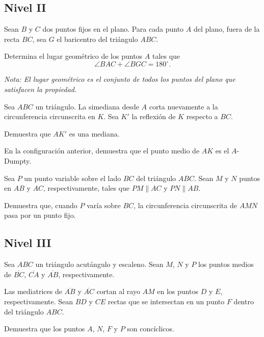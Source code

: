 \documentclass[11pt]{scrartcl}
\begin{document}
\subsection{Nivel II}

\begin{problem} %
Sean $B$ y $C$ dos puntos fijos en el plano. Para cada punto $A$ del plano, fuera de la recta $BC$, sea $G$ el baricentro del triángulo $ABC$. 

Determina el lugar geométrico de los puntos $A$ tales que
\[
\angle BAC + \angle BGC = 180^\circ.
\]

\textit{Nota: El lugar geométrico es el conjunto de todos los puntos del plano que satisfacen la propiedad.}
\end{problem}

\begin{problem}
    Sea $ABC$ un triángulo. La simediana desde $A$ corta nuevamente a la circunferencia circunscrita en $K$. Sea $K'$ la reflexión de $K$ respecto a $BC$. 

Demuestra que $AK'$ es una mediana.
\end{problem}

\begin{problem}
    En la configuración anterior, demuestra que el punto medio de $AK$ es el $A$-Dumpty.
\end{problem}

\begin{problem}
    Sea $P$ un punto variable sobre el lado $BC$ del triángulo $ABC$. Sean $M$ y $N$ puntos en $AB$ y $AC$, respectivamente, tales que $PM \parallel AC$ y $PN \parallel AB$.

Demuestra que, cuando $P$ varía sobre $BC$, la circunferencia circunscrita de $AMN$ pasa por un punto fijo.
\end{problem}
\subsection{Nivel III}

\begin{problem} %
     Sea $ABC$ un triángulo acutángulo y escaleno. Sean $M$, $N$ y $P$ los puntos medios de $\overline{BC}$, $\overline{CA}$ y $\overline{AB}$, respectivamente.  

Las mediatrices de $\overline{AB}$ y $\overline{AC}$ cortan al rayo $AM$ en los puntos $D$ y $E$, respectivamente. Sean $BD$ y $CE$ rectas que se intersectan en un punto $F$ dentro del triángulo $ABC$.  

Demuestra que los puntos $A$, $N$, $F$ y $P$ son concíclicos.
\end{problem}
\end{document}
